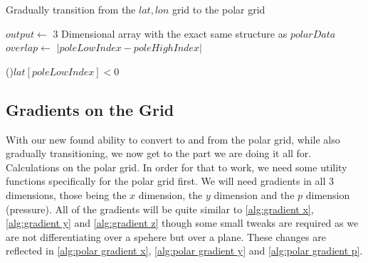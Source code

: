 \begin{algorithm}[htb]
    \caption{Gradually transition from the $lat, lon$ grid to the polar grid}
    \label{alg:polar interpolation}
    $output \leftarrow$ 3 Dimensional array with the exact same structure as $polarData$ \;
    $overlap \leftarrow $ $|poleLowIndex - poleHighIndex|$ \;
    
    \BlankLine
    \uIf(){$lat[poleLowIndex] < 0$}{
        \DontPrintSemicolon
        \PrintSemicolon
    } 

    \BlankLine
\end{algorithm}

\subsection{Gradients on the Grid}
With our new found ability to convert to and from the polar grid, while also gradually transitioning, we now get to the part we are doing it all for. Calculations on the polar grid. In order for
that to work, we need some utility functions specifically for the polar grid first. We will need gradients in all 3 dimensions, those being the $x$ dimension, the $y$ dimension and the $p$ 
dimension (pressure). All of the gradients will be quite similar to \autoref{alg:gradient x}, \autoref{alg:gradient y} and \autoref{alg:gradient z} though some small tweaks are required as we 
are not differentiating over a spehere but over a plane. These changes are reflected in \autoref{alg:polar gradient x}, \autoref{alg:polar gradient y} and \autoref{alg:polar gradient p}.


